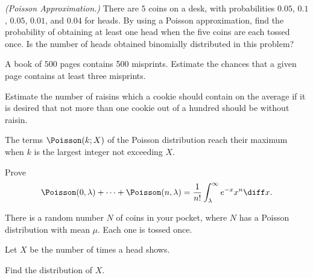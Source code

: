 \begin{problem}[Handout 10, \# 7]
  \emph{(Poisson Approximation.)} There are \(5\) coins on a desk, with
  probabilities \(0.05\), \(0.1\), \(0.05\), \(0.01\), and \(0.04\) for
  heads. By using a Poisson approximation, find the probability of
  obtaining at least one head when the five coins are each tossed once. Is
  the number of heads obtained binomially distributed in this problem?
\end{problem}
\begin{solution}

\end{solution}
\newpage

\begin{problem}[Handout 10, \# 8]
  A book of \(500\) pages contains 500 misprints. Estimate the chances that
  a given page contains at least three misprints.
\end{problem}
\begin{solution}

\end{solution}
\newpage

\begin{problem}[Handout 10, \# 9]
  Estimate the number of raisins which a cookie should contain on the
  average if it is desired that not more than one cookie out of a hundred
  should be without raisin.
\end{problem}
\begin{solution}

\end{solution}
\newpage

\begin{problem}[Handout 10, \# 10]
  The terms \(\Poisson(k;X)\) of the Poisson distribution reach their
  maximum when \(k\) is the largest integer not exceeding \(X\).
\end{problem}
\begin{solution}

\end{solution}
\newpage

\begin{problem}[Handout 10, \# 11]
  Prove
  \[
    \Poisson(0,\lambda)+\dotsb+\Poisson(n,\lambda)
    =\frac{1}{n!}\int_\lambda^\infty e^{-x}x^n\diff x.
  \]
\end{problem}
\begin{solution}

\end{solution}
\newpage

\begin{problem}[Handout 10, \# 12]
  There is a random number \(N\) of coins in your pocket, where \(N\) has a
  Poisson distribution with mean \(\mu\). Each one is tossed once.

  \noindent Let \(X\) be the number of times a head shows.

  \noindent Find the distribution of \(X\).
\end{problem}
\begin{solution}

\end{solution}
\newpage

